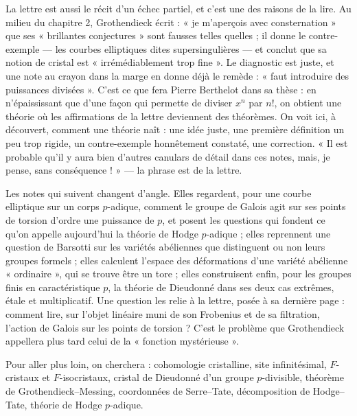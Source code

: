\documentclass[11pt,a4paper]{article}
\begin{document}
\begin{resume}
La lettre est aussi le récit d'un échec partiel, et c'est une des raisons de la
lire. Au milieu du chapitre 2, Grothendieck écrit : « je m'aperçois avec
consternation » que ses « brillantes conjectures » sont fausses telles
quelles ; il donne le contre-exemple — les courbes elliptiques dites
supersingulières — et conclut que sa notion de cristal est « irrémédiablement
trop fine ». Le diagnostic est juste, et une note au crayon dans la marge en
donne déjà le remède : « faut introduire des puissances divisées ». C'est ce
que fera Pierre Berthelot dans sa thèse : en n'épaississant que d'une façon
qui permette de diviser $x^n$ par $n!$, on obtient une théorie où les
affirmations de la lettre deviennent des théorèmes. On voit ici, à découvert,
comment une théorie naît : une idée juste, une première définition un peu trop
rigide, un contre-exemple honnêtement constaté, une correction. « Il est
probable qu'il y aura bien d'autres canulars de détail dans ces notes, mais,
je pense, sans conséquence ! » — la phrase est de la lettre.

Les notes qui suivent changent d'angle. Elles regardent, pour une courbe
elliptique sur un corps $p$-adique, comment le groupe de Galois agit sur ses
points de torsion d'ordre une puissance de $p$, et posent les questions qui
fondent ce qu'on appelle aujourd'hui la théorie de Hodge $p$-adique ; elles
reprennent une question de Barsotti sur les variétés abéliennes que
distinguent ou non leurs groupes formels ; elles calculent l'espace des
déformations d'une variété abélienne « ordinaire », qui se trouve être un
tore ; elles construisent enfin, pour les groupes finis en caractéristique
$p$, la théorie de Dieudonné dans ses deux cas extrêmes, étale et
multiplicatif. Une question les relie à la lettre, posée à sa dernière page :
comment lire, sur l'objet linéaire muni de son Frobenius et de sa filtration,
l'action de Galois sur les points de torsion ? C'est le problème que
Grothendieck appellera plus tard celui de la « fonction mystérieuse ».

Pour aller plus loin, on cherchera : cohomologie cristalline, site
infinitésimal, $F$-cristaux et $F$-isocristaux, cristal de Dieudonné d'un
groupe $p$-divisible, théorème de Grothendieck--Messing, coordonnées de
Serre--Tate, décomposition de Hodge--Tate, théorie de Hodge $p$-adique.

\end{resume}
\end{document}
